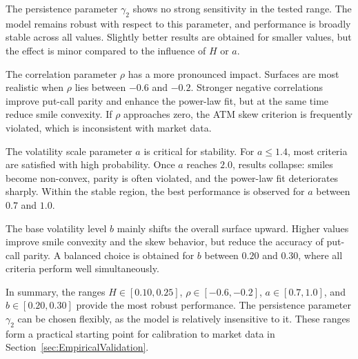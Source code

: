 The persistence parameter $\gamma_2$ shows no strong sensitivity in the tested range. The model remains robust with respect to this parameter, and performance is broadly stable across all values. Slightly better results are obtained for smaller values, but the effect is minor compared to the influence of $H$ or $a$.  

The correlation parameter $\rho$ has a more pronounced impact. Surfaces are most realistic when $\rho$ lies between $-0.6$ and $-0.2$. Stronger negative correlations improve put-call parity and enhance the power-law fit, but at the same time reduce smile convexity. If $\rho$ approaches zero, the ATM skew criterion is frequently violated, which is inconsistent with market data.  

The volatility scale parameter $a$ is critical for stability. For $a \leq 1.4$, most criteria are satisfied with high probability. Once $a$ reaches $2.0$, results collapse: smiles become non-convex, parity is often violated, and the power-law fit deteriorates sharply. Within the stable region, the best performance is observed for $a$ between $0.7$ and $1.0$.

The base volatility level $b$ mainly shifts the overall surface upward. Higher values improve smile convexity and the skew behavior, but reduce the accuracy of put-call parity. A balanced choice is obtained for $b$ between $0.20$ and $0.30$, where all criteria perform well simultaneously.  

In summary, the ranges $H \in [0.10, 0.25]$, $\rho \in [-0.6, -0.2]$, $a \in [0.7, 1.0]$, and $b \in [0.20, 0.30]$ provide the most robust performance. The persistence parameter $\gamma_2$ can be chosen flexibly, as the model is relatively insensitive to it. These ranges form a practical starting point for calibration to market data in Section~\ref{sec:EmpiricalValidation}.

